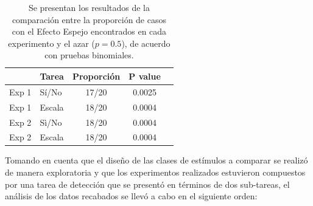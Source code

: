 \begin{table}
\caption[Pruebas Binomiales que comparan la proporción de casos encontrados con el Efecto Espejo]{Se presentan los resultados de la comparación entre la proporción de casos con el Efecto Espejo encontrados en cada experimento y el azar ($p=0.5$), de acuerdo con pruebas binomiales.}
\label{Tabla_Binom}
\centering
\begin{tabular}{l l | c c c}
\toprule
\textbf{} & \textbf{Tarea} & \textbf{Proporción} & \textbf{P value}\\
\midrule
Exp 1 & Sí/No & 17/20 & 0.0025 \\
Exp 1 & Escala & 18/20 & 0.0004\\
Exp 2 & Sì/No & 18/20 & 0.0004\\
Exp 2 & Escala & 18/20 & 0.0004\\
\bottomrule
\end{tabular}
\end{table}


Tomando en cuenta que el diseño de las clases de estímulos a comparar se realizó de manera exploratoria y que los experimentos realizados estuvieron compuestos por una tarea de detección que se presentó en términos de dos sub-tareas, el análisis de los datos recabados se llevó a cabo en el siguiente orden:\\

